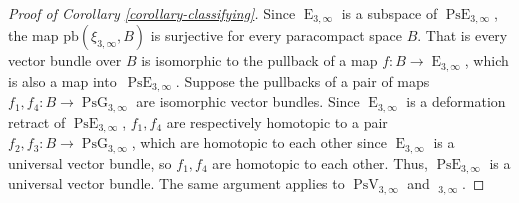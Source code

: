 \documentclass[JEP,XML,SOM,Unicode,NoFloatCountersInSection,published]{cedram}
\theoremstyle{remark}
\DeclareMathOperator{\pg}{PsG}
\DeclareMathOperator{\pe}{PsE}
\DeclareMathOperator{\e}{E}
\DeclareMathOperator{\poe}{Ps\widetilde{E}}
\DeclareMathOperator{\pstief}{PsV}
\begin{document}
\begin{proof}[Proof of Corollary \ref{corollary-classifying}]
Since $\e_{3,\infty}$ is a subspace of $\pe_{3,\infty}$, the map $\text{pb}(\xi_{3,\infty},B)$ is surjective for every paracompact space $B$. That is every vector bundle over $B$ is isomorphic to the pullback of a map $f : B \to \e_{3,\infty}$, which is also a map into~$\pe_{3,\infty}$.
Suppose the pullbacks of a pair of maps $f_1,f_4 : B \to \pg_{3,\infty}$ are isomorphic vector bundles.
Since $\e_{3,\infty}$ is a deformation retract of $\pe_{3,\infty}$, $f_1,f_4$ are respectively homotopic to a pair $f_2,f_3 : B \to \pg_{3,\infty}$, which are homotopic to each other since $\e_{3,\infty}$ is a universal vector bundle, so $f_1,f_4$ are homotopic to each other.
Thus, $\pe_{3,\infty}$ is a universal vector bundle.
The same argument applies to $\pstief_{3,\infty}$ and $\poe_{3,\infty}$.
\end{proof}

\backmatter


\end{document}

